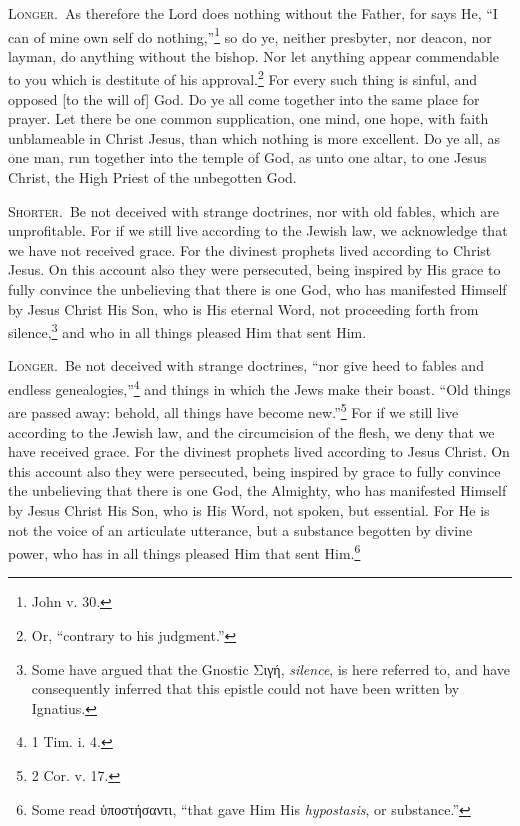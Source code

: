 \textsc{Longer.}~As therefore the Lord does nothing without the Father, for says He, “I can of mine own self do nothing,”\footnote{John v. 30.} so do ye, neither presbyter, nor deacon, nor layman, do anything without the bishop. Nor let anything appear commendable to you which is destitute of his approval.\footnote{Or, “contrary to his judgment.”} For every such thing is sinful, and opposed [to the will of] God. Do ye all come together into the same place for prayer. Let there be one common supplication, one mind, one hope, with faith unblameable in Christ Jesus, than which nothing is more excellent. Do ye all, as one man, run together into the temple of God, as unto one altar, to one Jesus Christ, the High Priest of the unbegotten God.


\textsc{Shorter.}~Be not deceived with strange doctrines, nor with old fables, which are unprofitable. For if we still live according to the Jewish law, we acknowledge that we have not received grace. For the divinest prophets lived according to Christ Jesus. On this account also they were persecuted, being inspired by His grace to fully convince the unbelieving that there is one God, who has manifested Himself by Jesus Christ His Son, who is His eternal Word, not proceeding forth from silence,\footnote{Some have argued that the Gnostic \textgreek{Σιγή}, \emph{silence}, is here referred to, and have consequently inferred that this epistle could not have been written by Ignatius.} and who in all things pleased Him that sent Him.

\textsc{Longer.}~Be not deceived with strange doctrines, “nor give heed to fables and endless genealogies,”\footnote{1 Tim. i. 4.} and things in which the Jews make their boast. “Old things are passed away: behold, all things have become new.”\footnote{2 Cor. v. 17.} For if we still live according to the Jewish law, and the circumcision of the flesh, we deny that we have received grace. For the divinest prophets lived according to Jesus Christ. On this account also they were persecuted, being inspired by grace to fully convince the unbelieving that there is one God, the Almighty, who has manifested Himself by Jesus Christ His Son, who is His Word, not spoken, but essential. For He is not the voice of an articulate utterance, but a substance begotten by divine power, who has in all things pleased Him that sent Him.\footnote{Some read \textgreek{ὑποστήσαντι}, “that gave Him His \emph{hypostasis}, or substance.”}

